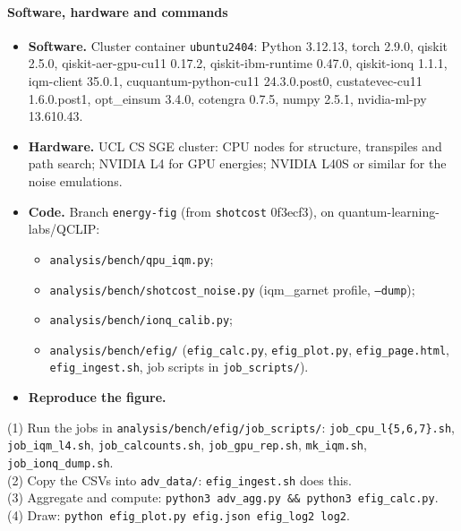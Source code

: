 \paragraph{Software, hardware and commands}

\begin{itemize}
  \item \textbf{Software.} Cluster container \texttt{ubuntu2404}: Python 3.12.13, torch 2.9.0, qiskit 2.5.0, qiskit-aer-gpu-cu11 0.17.2, qiskit-ibm-runtime 0.47.0, qiskit-ionq 1.1.1, iqm-client 35.0.1, cuquantum-python-cu11 24.3.0.post0, custatevec-cu11 1.6.0.post1, opt\_einsum 3.4.0, cotengra 0.7.5, numpy 2.5.1, nvidia-ml-py 13.610.43.
  \item \textbf{Hardware.} UCL CS SGE cluster: CPU nodes for structure, transpiles and path search; NVIDIA L4 for GPU energies; NVIDIA L40S or similar for the noise emulations.
  \item \textbf{Code.} Branch \texttt{energy-fig} (from \texttt{shotcost} 0f3ecf3), on quantum-learning-labs/QCLIP:
  \begin{itemize}
    \item \texttt{analysis/bench/qpu\_iqm.py};
    \item \texttt{analysis/bench/shotcost\_noise.py} (iqm\_garnet profile, \texttt{--dump});
    \item \texttt{analysis/bench/ionq\_calib.py};
    \item \texttt{analysis/bench/efig/} (\texttt{efig\_calc.py}, \texttt{efig\_plot.py}, \texttt{efig\_page.html}, \texttt{efig\_ingest.sh}, job scripts in \texttt{job\_scripts/}).
  \end{itemize}
  \item \textbf{Reproduce the figure.}
\end{itemize}
(1) Run the jobs in \texttt{analysis/bench/efig/job\_scripts/}: \texttt{job\_cpu\_l\{5,6,7\}.sh}, \texttt{job\_iqm\_l4.sh}, \texttt{job\_calcounts.sh}, \texttt{job\_gpu\_rep.sh}, \texttt{mk\_iqm.sh}, \texttt{job\_ionq\_dump.sh}.\\
(2) Copy the CSVs into \texttt{adv\_data/}: \texttt{efig\_ingest.sh} does this.\\
(3) Aggregate and compute: \texttt{python3 adv\_agg.py \&\& python3 efig\_calc.py}.\\
(4) Draw: \texttt{python efig\_plot.py efig.json efig\_log2 log2}.\\

